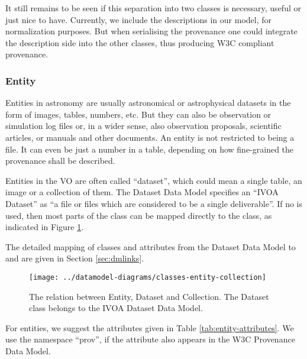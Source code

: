
It still remains to be seen if this separation into two classes is necessary, 
useful or just nice to have. Currently, we include the descriptions in our model, 
for normalization purposes. But when serialising the provenance one could 
integrate the description side into the other classes, thus producing W3C 
compliant provenance.


\subsubsection{Entity}
Entities in astronomy are usually astronomical or astrophysical datasets in the 
form of images, tables, numbers, etc. But they can also be observation or 
simulation log files or, in a wider sense, also observation proposals, scientific 
articles, or manuals and other documents. An entity is not restricted to being
a file. 
It can even be just a number in a table, depending on how fine-grained the 
provenance shall be described.

Entities in the VO are often called ``dataset'', which could mean a single 
table, an image or a collection of them. The Dataset Data Model 
\citep{std:DatasetDM} specifies an ``IVOA Dataset'' as ``a file or files which 
are considered to be a single deliverable''. If no  is used, then most parts of the  class can be mapped
directly to the  class, as indicated in Figure \ref{fig:entityclasses}.

The detailed mapping of classes and attributes from the Dataset Data Model 
to  and  are given in Section \ref{sec:dmlinks}. 

\begin{figure}[h]
\centering
\texttt{[image: ../datamodel-diagrams/classes-entity-collection]}
\caption{The relation between Entity, Dataset and Collection. The Dataset class belongs to
the IVOA Dataset Data Model.}
\label{fig:entityclasses}
\end{figure}

For entities, we suggest the attributes given in Table 
\ref{tab:entity-attributes}. 
We use the namespace ``prov'', if the attribute also appears in the W3C 
Provenance Data Model.

